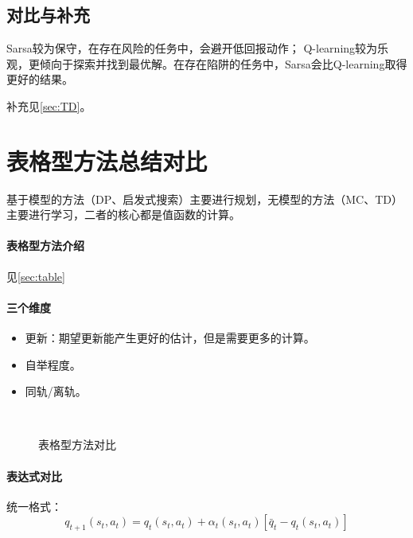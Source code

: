 \documentclass[
12pt, %
a4paper, 
oneside, %
headinclude,footinclude, %
]{scrartcl}
\begin{document}
\subsection[对比与补充]{对比与补充}\label{sec:TD back}
Sarsa较为保守，在存在风险的任务中，会避开低回报动作； Q-learning较为乐观，更倾向于探索并找到最优解。在存在陷阱的任务中，Sarsa会比Q-learning取得更好的结果。

补充见\ref{sec:TD}。
\section{表格型方法总结对比}
基于模型的方法（DP、启发式搜索）主要进行规划，无模型的方法（MC、TD）主要进行学习，二者的核心都是值函数的计算。
\paragraph{表格型方法介绍}\label{sec:table back}
见\ref{sec:table}
\paragraph{三个维度}
\begin{itemize}
\item 更新：期望更新能产生更好的估计，但是需要更多的计算。
\item 自举程度。
\item 同轨/离轨。
\end{itemize}

\begin{figure}[H]
\centering
{} \quad
{} \\
 \quad
{} \quad
{}
\caption[表格型方法对比]{表格型方法对比}
\end{figure}
\paragraph{表达式对比}
统一格式：
$$ q_{t + 1}(s_t, a_t) = q_t(s_t, a_t) + \alpha_t(s_t, a_t)[\bar{q}_t - q_t(s_t, a_t)] $$
\end{document}
